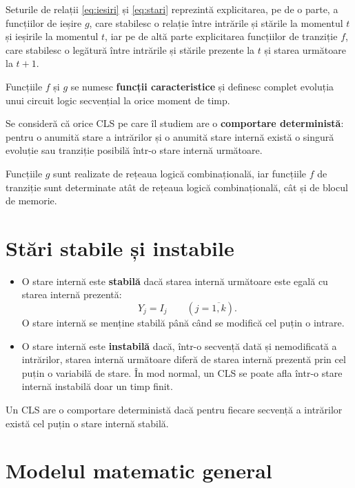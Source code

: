 Seturile de relații \eqref{eq:iesiri} și \eqref{eq:stari} reprezintă
explicitarea, pe de o parte, a funcțiilor de ieșire $g$, care stabilesc o relație
între intrările și stările la momentul $t$ și ieșirile la momentul $t$, iar pe de
altă parte explicitarea funcțiilor de tranziție $f$, care stabilesc o legătură
între intrările și stările prezente la $t$ și starea următoare la $t+1$.

\begin{retine}
Funcțiile $f$ și $g$ se numesc \textbf{funcții caracteristice} și definesc
complet evoluția unui circuit logic secvențial la orice moment de timp.
\end{retine}

Se consideră că orice CLS pe care îl studiem are o \textbf{comportare
deterministă}: pentru o anumită stare a intrărilor și o anumită stare internă
există o singură evoluție sau tranziție posibilă într-o stare internă următoare.

Funcțiile $g$ sunt realizate de rețeaua logică combinațională, iar funcțiile $f$
de tranziție sunt determinate atât de rețeaua logică combinațională, cât și de
blocul de memorie.

\section{Stări stabile și instabile}

\begin{itemize}
  \item O stare internă este \textbf{stabilă} dacă starea internă următoare este
  egală cu starea internă prezentă:
  \[
    Y_j = I_j \qquad (j = \overline{1,k}).
  \]
  O stare internă se menține stabilă până când se modifică cel puțin o intrare.

  \item O stare internă este \textbf{instabilă} dacă, într-o secvență dată și
  nemodificată a intrărilor, starea internă următoare diferă de starea internă
  prezentă prin cel puțin o variabilă de stare. În mod normal, un CLS se poate
  afla într-o stare internă instabilă doar un timp finit.
\end{itemize}

Un CLS are o comportare deterministă dacă pentru fiecare secvență a intrărilor
există cel puțin o stare internă stabilă.

\section{Modelul matematic general}

